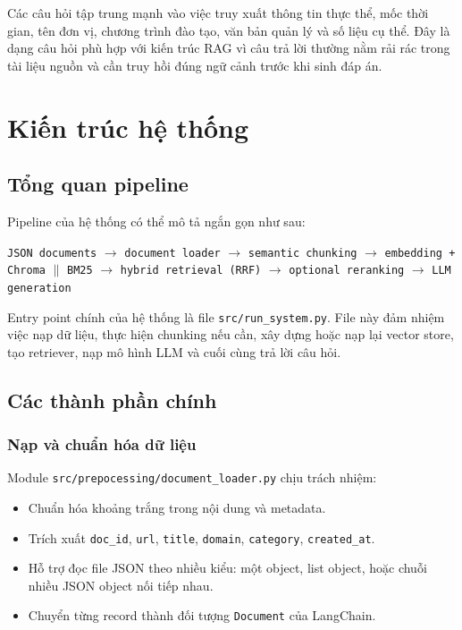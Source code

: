 \documentclass[12pt,a4paper]{article}
\begin{document}
Các câu hỏi tập trung mạnh vào việc truy xuất thông tin thực thể, mốc thời gian, tên đơn vị, chương trình đào tạo, văn bản quản lý và số liệu cụ thể. Đây là dạng câu hỏi phù hợp với kiến trúc RAG vì câu trả lời thường nằm rải rác trong tài liệu nguồn và cần truy hồi đúng ngữ cảnh trước khi sinh đáp án.

\section{Kiến trúc hệ thống}

\subsection{Tổng quan pipeline}

Pipeline của hệ thống có thể mô tả ngắn gọn như sau:

\begin{center}
\texttt{JSON documents} $\rightarrow$
\texttt{document loader} $\rightarrow$
\texttt{semantic chunking} $\rightarrow$
\texttt{embedding + Chroma} $\parallel$
\texttt{BM25} $\rightarrow$
\texttt{hybrid retrieval (RRF)} $\rightarrow$
\texttt{optional reranking} $\rightarrow$
\texttt{LLM generation}
\end{center}

Entry point chính của hệ thống là file \texttt{src/run\_system.py}. File này đảm nhiệm việc nạp dữ liệu, thực hiện chunking nếu cần, xây dựng hoặc nạp lại vector store, tạo retriever, nạp mô hình LLM và cuối cùng trả lời câu hỏi.

\subsection{Các thành phần chính}

\subsubsection{Nạp và chuẩn hóa dữ liệu}

Module \texttt{src/prepocessing/document\_loader.py} chịu trách nhiệm:
\begin{itemize}[leftmargin=1.5cm]
    \item Chuẩn hóa khoảng trắng trong nội dung và metadata.
    \item Trích xuất \texttt{doc\_id}, \texttt{url}, \texttt{title}, \texttt{domain}, \texttt{category}, \texttt{created\_at}.
    \item Hỗ trợ đọc file JSON theo nhiều kiểu: một object, list object, hoặc chuỗi nhiều JSON object nối tiếp nhau.
    \item Chuyển từng record thành đối tượng \texttt{Document} của LangChain.
\end{itemize}
\end{document}

